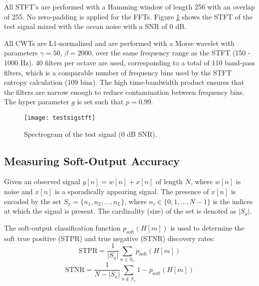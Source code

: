 All STFT's are performed with a Hamming window of length 256 with an overlap of 255. No zero-padding is applied for the FFTs. Figure \ref{fig:testsigstft} shows the STFT of the test signal mixed with the ocean noise with a SNR of 0 dB.
 
 All CWTs are L1-normalized and are performed with a Morse wavelet with parameters $\gamma = 50$, $\beta = 2000$, over the same frequency range as the STFT (150 - 1000 Hz). 40 filters per octave are used, corresponding to a total of 110 band-pass filters, which is a comparable number of frequency bins used by the STFT entropy calculation (109 bins). The high time-bandwidth product ensures that the filters are narrow enough to reduce contamination between frequency bins. The hyper parameter $g$ is set such that $p = 0.99$. 
 
  \begin{figure}
 	\centering
 	\texttt{[image: testsigstft]}
 	\caption{Spectrogram of the test signal (0 dB SNR).}
 	\label{fig:testsigstft}
 \end{figure}
 

\subsection{Measuring Soft-Output Accuracy}

Given an observed signal $y[n] = w[n] + x[n]$ of length $N$, where $w[n]$ is noise and $x[n]$ is a sporadically appearing signal. The presence of $x[n]$ is encoded by the set $S_x = \{ {n_1, n_2, ..., n_L} \}$, where $n_i \in \{0, 1, ..., N -1\}$ is the indices at which the signal is present. The cardinality (size) of the set is denoted as $|S_x|$.

The soft-output classification function $p_\text{soft}(H[m])$ is used to determine the soft true positive (STPR) and true negative (STNR) discovery rates:
\begin{equation*}
	\text{STPR} = \frac{1}{|S_x|} \sum_{n \in S_x} p_\text{soft}(H[m])
\end{equation*}
\begin{equation*}
	\text{STNR} = \frac{1}{N - |S_x|} \sum_{n \notin S_x} 1 - p_\text{soft}(H[m])
\end{equation*}

